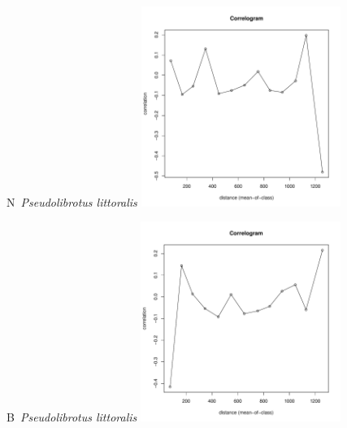 \documentclass[12pt, a4paper]{disser}
\begin{document}
\begin{figure}[h]
	
	\begin{minipage}[b]{.46\linewidth}
	\begin{center}
	{\small N~{\it Pseudolibrotus littoralis}}
	\includegraphics[width=65mm]{../Barenc_Sea/distribution_Moran/Plyazh081_moran_N_Pseudolibrotus_littoralis_.pdf}

	\end{center}
	\end{minipage}
	\hfil %
	\begin{minipage}[b]{.46\linewidth}
	\begin{center}
	{\small B~{\it Pseudolibrotus littoralis}}
		\includegraphics[width=65mm]{../Barenc_Sea/distribution_Moran/Plyazh081_moran_B_Pseudolibrotus_littoralis_.pdf}
	\end{center}
	\end{minipage}






\end{figure}
\end{document}
